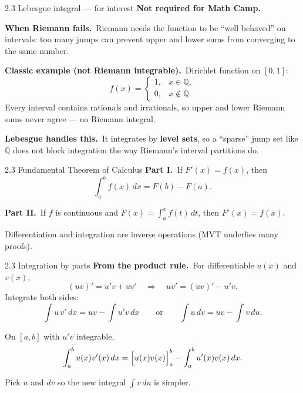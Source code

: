 \documentclass[11pt,aspectratio=169]{beamer}
\begin{document}
\begin{frame}{2.3 Lebesgue integral --- for interest}
  \footnotesize
  \textcolor{mAccent}{\textbf{Not required for Math Camp.}}

  \medskip
  \textbf{When Riemann fails.}\
  Riemann needs the function to be ``well behaved'' on intervals:
  too many jumps can prevent upper and lower sums from converging to the same number.

  \medskip
  \textbf{Classic example (not Riemann integrable).}\
  Dirichlet function on $[0,1]$:
  \[
    f(x)=
    \begin{cases}
      1, & x\in\mathbb{Q},\\
      0, & x\notin\mathbb{Q}.
    \end{cases}
  \]
  Every interval contains rationals and irrationals, so upper and lower Riemann sums
  never agree --- no Riemann integral.

  \medskip
  \textbf{Lebesgue handles this.}\
  It integrates by \textbf{level sets}, so a ``sparse'' jump set like $\mathbb{Q}$ does
  not block integration the way Riemann's interval partitions do.
\end{frame}

\begin{frame}{2.3 Fundamental Theorem of Calculus}
  \footnotesize
  \textbf{Part I.}\ If $F'(x)=f(x)$, then
  \[
    \int_a^b f(x)\,dx = F(b)-F(a).
  \]

  \medskip
  \textbf{Part II.}\ If $f$ is continuous and $F(x)=\displaystyle\int_a^x f(t)\,dt$, then
  $F'(x)=f(x)$.

  \medskip
  {\scriptsize Differentiation and integration are inverse operations (MVT underlies many proofs).}
\end{frame}

\begin{frame}{2.3 Integration by parts}
  \footnotesize
  \textbf{From the product rule.}\
  For differentiable $u(x)$ and $v(x)$,
  \[
    (uv)' = u'v + uv'
    \quad\Rightarrow\quad
    uv' = (uv)' - u'v.
  \]
  Integrate both sides:
  \[
    \int u\,v'\,dx = uv - \int u'v\,dx
    \qquad\text{or}\qquad
    \boxed{\int u\,dv = uv - \int v\,du}.
  \]

  \medskip
  On $[a,b]$ with $u'v$ integrable,
  \[
    \int_a^b u(x)v'(x)\,dx
    = \Bigl[u(x)v(x)\Bigr]_a^b - \int_a^b u'(x)v(x)\,dx.
  \]

  \medskip
  {\scriptsize Pick $u$ and $dv$ so the new integral $\displaystyle\int v\,du$ is simpler.}
\end{frame}
\end{document}
